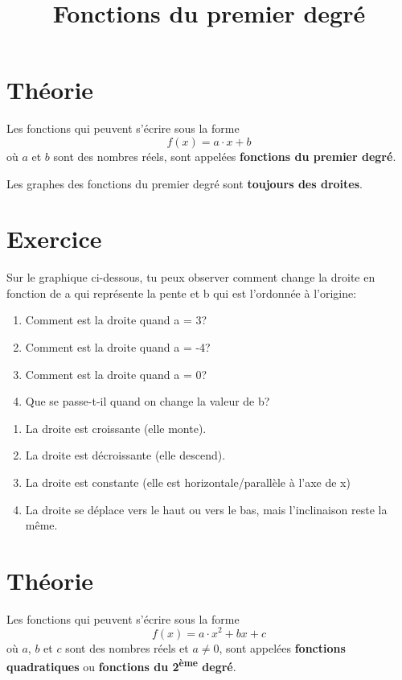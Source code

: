 \documentclass[a4paper,11pt]{article}
\begin{document}
\title{Fonctions du premier degré}
\date{}
\maketitle

\section{Théorie}
Les fonctions qui peuvent s'écrire sous la forme
$$f(x)=a\cdot x +b$$
où $a$ et $b$ sont des nombres réels, sont appelées \textbf{fonctions du premier degré}.

Les graphes des fonctions du premier degré sont \textbf{toujours des droites}.

\section{Exercice}
Sur le graphique ci-dessous, tu peux observer comment change la droite en fonction de a qui représente la pente et b qui est l'ordonnée à l'origine:\par
{}
\begin{enumerate}
    \item Comment est la droite quand a = 3?
    \item Comment est la droite quand a = -4?
    \item Comment est la droite quand a = 0?
    \item Que se passe-t-il quand on change la valeur de b?
\end{enumerate}

\begin{solution}
\begin{enumerate}
    \item La droite est croissante (elle monte).
    \item La droite est décroissante (elle descend).
    \item La droite est constante (elle est horizontale/parallèle à l'axe de x)
    \item La droite se déplace vers le haut ou vers le bas, mais l'inclinaison reste la même.
\end{enumerate}
\end{solution}

\section{Théorie}
Les fonctions qui peuvent s'écrire sous la forme
$$f(x)=a\cdot x^2 + bx + c$$
où $a$, $b$ et $c$ sont des nombres réels et $a \ne 0$, sont appelées \textbf{fonctions quadratiques} ou \textbf{fonctions du 2\textsuperscript{ème} degré}.
\end{document}

